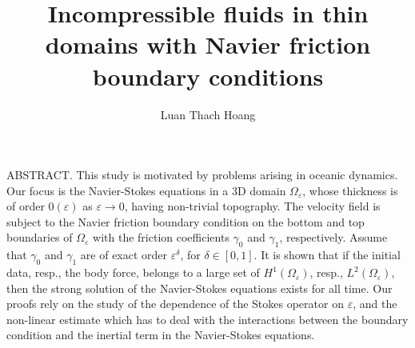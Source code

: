 \documentclass[twoside]{amsart}
\title{Incompressible fluids in thin domains with Navier friction boundary conditions}
\author{Luan Thach Hoang}
\begin{document}


\maketitle

ABSTRACT. 
This study is motivated by problems arising in oceanic dynamics.
Our focus is the Navier-Stokes equations in a 3D domain $\Omega_\varepsilon$, whose thickness is of order $0(\varepsilon)$
as $\varepsilon\to 0$, having non-trivial topography.
The velocity field is subject to the Navier friction boundary condition on the bottom and top boundaries of $\Omega_\varepsilon$
with the friction coefficients $\gamma_0$ and $\gamma_1$, respectively.
Assume that $\gamma_0$ and $\gamma_1$ are of exact order $\varepsilon^\delta$, for $\delta\in[0,1]$.
It is shown that if the initial data, resp., the body force, belongs to a large set of $H^1(\Omega_\varepsilon)$, resp., $L^2(\Omega_\varepsilon)$, then the strong solution of the Navier-Stokes equations exists for all time.
Our proofs rely on the study of the dependence of the Stokes operator on $\varepsilon$, 
and the non-linear estimate which has to deal with the interactions between the boundary condition and the inertial term in the Navier-Stokes equations.


\end{document}
